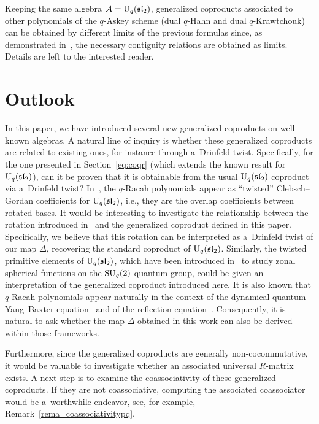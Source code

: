 \documentclass[pdftex]{sigma}
\numberwithin{equation}{section}
\theoremstyle{definition}
\begin{document}
Keeping the same algebra $\mathcal{A}={\rm U}_q(\mathfrak{sl}_2)$, generalized coproducts associated to other polynomials of the $q$-Askey scheme (dual $q$-Hahn and dual $q$-Krawtchouk) can be obtained by different limits of the previous formulas since, as demonstrated in~\cite{contiguity}, the necessary contiguity relations are obtained as limits. Details are left to the interested reader.

\section{Outlook}\label{sec:outlook}

In this paper, we have introduced several new generalized coproducts on well-known algebras.
A natural line of inquiry is whether these generalized coproducts are related to existing ones, for instance through a~Drinfeld twist. Specifically, for the one presented in Section~\ref{eq:coqr} (which extends the known result for ${\rm U}_q(\mathfrak{sl}_2)$), can it be proven that it is obtainable from the usual ${\rm U}_q(\mathfrak{sl}_2)$ coproduct via a~Drinfeld twist? In~\cite{GZ92}, the $q$-Racah polynomials appear as ``twisted'' Clebsch--Gordan coefficients for ${\rm U}_q(\mathfrak{sl}_2)$, i.e., they are the overlap coefficients between rotated bases. It would be interesting to investigate the relationship between the rotation introduced in~\cite{GZ92} and the generalized coproduct defined in this paper. Specifically, we believe that this rotation can be interpreted as a~Drinfeld twist of our map $\Delta$, recovering the standard coproduct of ${\rm U}_q(\mathfrak{sl}_2)$.
Similarly, the twisted primitive elements of ${\rm U}_q(\mathfrak{sl}_2)$, which have been introduced in~\cite{Koelink96, Koor93,NM90} to study zonal spherical functions on the ${\rm SU}_q(2)$ quantum group, could be given an interpretation of the generalized coproduct introduced here. It is also known that $q$-Racah polynomials appear naturally in the context of the dynamical quantum Yang--Baxter equation~\cite{KR01} and of the reflection equation~\cite{Bas}. Consequently, it is natural to ask whether the map $\Delta$ obtained in this work can also be derived within those frameworks.

Furthermore, since the generalized coproducts are generally non-cocommutative, it would be valuable to investigate whether an associated universal $R$-matrix exists. A next step is to examine the coassociativity of these generalized coproducts. If they are not coassociative, computing the associated coassociator would be a~worthwhile endeavor, see, for example, Remark~\ref{rema_coassociativitypq}.
\end{document}
